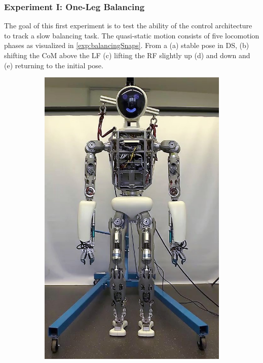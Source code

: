 \subsubsection{Experiment I: One-Leg Balancing}
The goal of this first experiment is to test the ability of the control architecture to track a slow balancing task. The quasi-static motion consists of five locomotion phases as visualized in \cref{exp:balancingSnaps}. From a (a) stable pose in \gls{DS}, (b) shifting the \gls{CoM} above the \gls{LF} (c) lifting the \gls{RF} slightly up (d) and down and (e) returning to the initial pose.
\begin{figure}
\begin{subfigure}{.2\textwidth}
	\includegraphics[width=.95\linewidth]{experiments/balancing/snaps/1}

\end{subfigure}
\end{figure}
